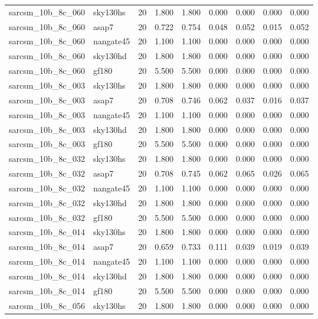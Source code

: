 \begin{tabular}{llrrrrrrr}
sarcsm\_10b\_8c\_060 & sky130hs & 20 & 1.800 & 1.800 & 0.000 & 0.000 & 0.000 & 0.000 \\
sarcsm\_10b\_8c\_060 & asap7 & 20 & 0.722 & 0.754 & 0.048 & 0.052 & 0.015 & 0.052 \\
sarcsm\_10b\_8c\_060 & nangate45 & 20 & 1.100 & 1.100 & 0.000 & 0.000 & 0.000 & 0.000 \\
sarcsm\_10b\_8c\_060 & sky130hd & 20 & 1.800 & 1.800 & 0.000 & 0.000 & 0.000 & 0.000 \\
sarcsm\_10b\_8c\_060 & gf180 & 20 & 5.500 & 5.500 & 0.000 & 0.000 & 0.000 & 0.000 \\
sarcsm\_10b\_8c\_003 & sky130hs & 20 & 1.800 & 1.800 & 0.000 & 0.000 & 0.000 & 0.000 \\
sarcsm\_10b\_8c\_003 & asap7 & 20 & 0.708 & 0.746 & 0.062 & 0.037 & 0.016 & 0.037 \\
sarcsm\_10b\_8c\_003 & nangate45 & 20 & 1.100 & 1.100 & 0.000 & 0.000 & 0.000 & 0.000 \\
sarcsm\_10b\_8c\_003 & sky130hd & 20 & 1.800 & 1.800 & 0.000 & 0.000 & 0.000 & 0.000 \\
sarcsm\_10b\_8c\_003 & gf180 & 20 & 5.500 & 5.500 & 0.000 & 0.000 & 0.000 & 0.000 \\
sarcsm\_10b\_8c\_032 & sky130hs & 20 & 1.800 & 1.800 & 0.000 & 0.000 & 0.000 & 0.000 \\
sarcsm\_10b\_8c\_032 & asap7 & 20 & 0.708 & 0.745 & 0.062 & 0.065 & 0.026 & 0.065 \\
sarcsm\_10b\_8c\_032 & nangate45 & 20 & 1.100 & 1.100 & 0.000 & 0.000 & 0.000 & 0.000 \\
sarcsm\_10b\_8c\_032 & sky130hd & 20 & 1.800 & 1.800 & 0.000 & 0.000 & 0.000 & 0.000 \\
sarcsm\_10b\_8c\_032 & gf180 & 20 & 5.500 & 5.500 & 0.000 & 0.000 & 0.000 & 0.000 \\
sarcsm\_10b\_8c\_014 & sky130hs & 20 & 1.800 & 1.800 & 0.000 & 0.000 & 0.000 & 0.000 \\
sarcsm\_10b\_8c\_014 & asap7 & 20 & 0.659 & 0.733 & 0.111 & 0.039 & 0.019 & 0.039 \\
sarcsm\_10b\_8c\_014 & nangate45 & 20 & 1.100 & 1.100 & 0.000 & 0.000 & 0.000 & 0.000 \\
sarcsm\_10b\_8c\_014 & sky130hd & 20 & 1.800 & 1.800 & 0.000 & 0.000 & 0.000 & 0.000 \\
sarcsm\_10b\_8c\_014 & gf180 & 20 & 5.500 & 5.500 & 0.000 & 0.000 & 0.000 & 0.000 \\
sarcsm\_10b\_8c\_056 & sky130hs & 20 & 1.800 & 1.800 & 0.000 & 0.000 & 0.000 & 0.000 \\

\end{tabular}
